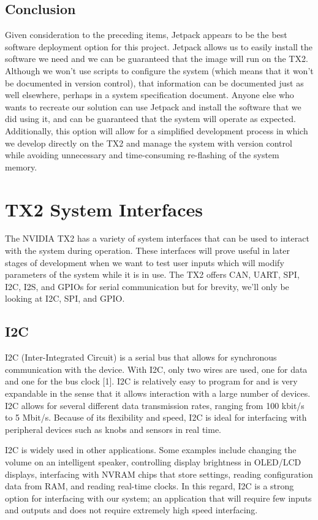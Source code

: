 \documentclass[letterpaper,10pt,serif,draftclsnofoot,onecolumn,compsoc,titlepage]{IEEEtran}
\begin{document}
\subsection{Conclusion}
Given consideration to the preceding items, Jetpack appears to be the best software deployment option for this project. Jetpack allows us to easily install the software we need and we can be guaranteed that the image will run on the TX2. Although we won't use scripts to configure the system (which means that it won't be documented in version control), that information can be documented just as well elsewhere, perhaps in a system specification document. Anyone else who wants to recreate our solution can use Jetpack and install the software that we did using it, and can be guaranteed that the system will operate as expected. Additionally, this option will allow for a simplified development process in which we develop directly on the TX2 and manage the system with version control while avoiding unnecessary and time-consuming re-flashing of the system memory.

\newpage
\section{TX2 System Interfaces}
The NVIDIA TX2 has a variety of system interfaces that can be used to interact with the system during operation. These interfaces will prove useful in later stages of development when we want to test user inputs which will modify parameters of the system while it is in use. The TX2 offers CAN, UART, SPI, I2C, I2S, and GPIOs for serial communication but for brevity, we'll only be looking at I2C, SPI, and GPIO.

\subsection{I2C}
I2C (Inter-Integrated Circuit) is a serial bus that allows for synchronous communication with the device. With I2C, only two wires are used, one for data and one for the bus clock [1]. I2C is relatively easy to program for and is very expandable in the sense that it allows interaction with a large number of devices. I2C allows for several different data transmission rates, ranging from 100 kbit/s to 5 Mbit/s. Because of its flexibility and speed, I2C is ideal for interfacing with peripheral devices such as knobs and sensors in real time. 

I2C is widely used in other applications. Some examples include changing the volume on an intelligent speaker, controlling display brightness in OLED/LCD displays, interfacing with NVRAM chips that store settings, reading configuration data from RAM, and reading real-time clocks. In this regard, I2C is a strong option for interfacing with our system; an application that will require few inputs and outputs and does not require extremely high speed interfacing.
\end{document}
